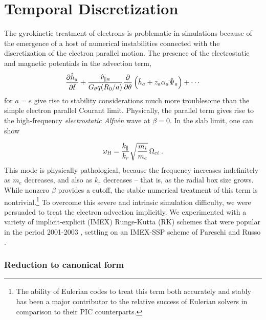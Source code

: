 \chapter{Temporal Discretization}\label{chap.time}

The gyrokinetic treatment of electrons is problematic in simulations 
because of the emergence of a host of numerical instabilities connected 
with the discretization of the electron parallel motion.  The presence 
of the electrostatic and magnetic potentials in the advection term, 
%
\begin{equation}
\frac{\partial\hat{h}_a}{\partial\hat{t}} 
+ \frac{\hat{v}_{\parallel a}}{G_\theta q (R_0/a)} \frac{\partial}{\partial\theta}
\left( \hat{h}_a + z_a \alpha_a \hat{\Psi}_a \right) + \cdots
\end{equation}
%
for $a = e$ give rise to stability considerations much more troublesome 
than the simple electron parallel Courant limit.  Physically, the parallel 
term gives rise to the high-frequency {\it electrostatic Alfv\'en} 
wave \cite{lee:2001} at $\beta=0$.  In the slab limit, one can show

\begin{equation}
\omega_{\rm H} = \frac{k_\parallel}{k_r} 
\sqrt{\frac{m_i}{m_e}} \, \Omega_{ci} \; .
\end{equation}
%
This mode is physically pathological, because the frequency increases 
indefinitely as $m_e$ decreases, and also as $k_r$ decreases -- that is, 
as the radial box size grows.  While nonzero $\beta$ provides a cutoff,
the stable numerical treatment of this term is nontrivial.\footnote{The 
ability of Eulerian codes to treat this term both accurately and stably 
has been a major contributor to the relative success of Eulerian solvers 
in comparison to their PIC counterparts.}  To overcome this severe 
and intrinsic simulation difficulty, we were persuaded to treat the 
electron advection implicitly.  We experimented with a variety of 
implicit-explicit (IMEX) Runge-Kutta (RK) schemes that were popular in 
the period 2001-2003 
\cite{ascher:1995,ascher:1997,pareschi:2000,pareschi:2002,kennedy:2003}, 
settling on an IMEX-SSP scheme of Pareschi and Russo \cite{pareschi:2002}.

\subsection{Reduction to canonical form}

